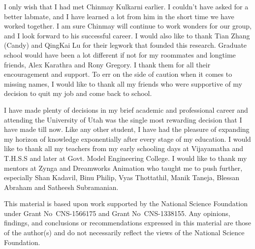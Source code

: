 I only wish that I had met Chinmay Kulkarni earlier. 
I couldn't have asked for a better labmate, and I have learned a lot from him in the short time we have worked together. 
I am sure Chinmay will continue to work wonders for our group, and I look forward to his successful career. 
I would also like to thank Tian Zhang (Candy) and QingKai Lu for their legwork that founded this research. 
Graduate school would have been a lot different if not for my roommates and longtime friends, Alex Karathra and Rony Gregory. 
I thank them for all their encouragement and support. To err on the side of caution when it comes to missing names, I would like to thank all my friends who were supportive of my decision to quit my job and come back to school.

I have made plenty of decisions in my brief academic and professional career and attending the University of Utah was the single most rewarding decision that I have made till now. 
Like any other student, I have had the pleasure of expanding my horizon of knowledge exponentially after every stage of my education. 
I would like to thank all my teachers from my early schooling days at Vijayamatha and T.H.S.S and later at Govt. Model Engineering College. 
I would like to thank my mentors at Zynga and Dreamworks Animation who taught me to push further, especially Shan Kadavil, Binu Philip, Vyas Thottathil, Manik Taneja, Blessan Abraham and Satheesh Subramanian.

This material is based upon work supported by the National Science Foundation \linebreak under Grant No\ CNS-1566175 and Grant No\ CNS-1338155.
Any opinions, findings, and conclusions or recommendations expressed in this material are those of the author(s) and do not necessarily reflect the views of the National Science Foundation.